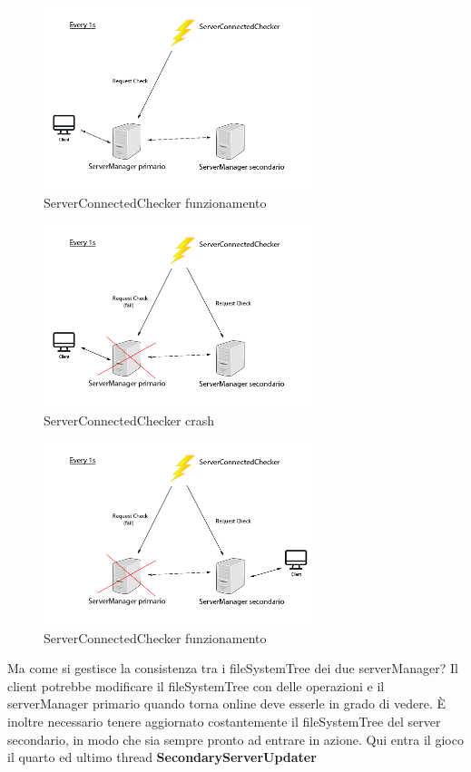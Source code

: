 \documentclass[]{article}
\begin{document}
\begin{figure}
	\centering
	\includegraphics[width=8cm]{../Img/ServerConnectedChecker1.png}
	\caption[]{ServerConnectedChecker funzionamento}
	\label{fig:ServerConnectedChecker1}
	
\end{figure}
\begin{figure}
	\centering
	\includegraphics[width=8cm]{../Img/ServerConnectedChecker2.png}
	\caption[]{ServerConnectedChecker crash}
	\label{fig:ServerConnectedChecker2}
	
\end{figure}
\begin{figure}
	\centering
	\includegraphics[width=8cm]{../Img/ServerConnectedChecker3.png}
	\caption[]{ServerConnectedChecker funzionamento}
	\label{fig:ServerConnectedChecker3}
	
\end{figure}


Ma come si gestisce la consistenza tra i fileSystemTree dei due serverManager? Il client potrebbe modificare il fileSystemTree con delle operazioni e il serverManager primario quando torna online deve esserle in grado di vedere. È inoltre necessario tenere aggiornato costantemente il fileSystemTree del server secondario, in modo che sia sempre pronto ad entrare in azione. Qui entra il gioco il quarto ed ultimo thread \textbf{SecondaryServerUpdater}
\end{document}
